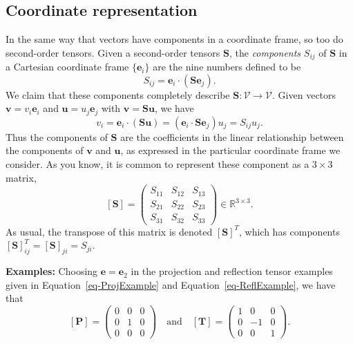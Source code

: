 \documentclass[
  letterpaper,
  DIV=11,
  numbers=noendperiod]{scrreprt}
\theoremstyle{plain}
\theoremstyle{remark}
\begin{document}
\subsection{Coordinate representation}\label{coordinate-representation}

In the same way that vectors have components in a coordinate frame, so
too do second-order tensors. Given a second-order tensors
\({\boldsymbol{S}}\), the \emph{components} \(S_{ij}\) of
\({\boldsymbol{S}}\) in a Cartesian coordinate frame
\(\{{\boldsymbol{e}}_i\}\) are the nine numbers defined to be
\[S_{ij} = {\boldsymbol{e}}_i\cdot ({\boldsymbol{S}}{\boldsymbol{e}}_j).\]
We claim that these components completely describe
\({\boldsymbol{S}}:{\mathcal{V}}\to{\mathcal{V}}\). Given vectors
\({\boldsymbol{v}}= v_i{\boldsymbol{e}}_i\) and
\({\boldsymbol{u}}= u_j{\boldsymbol{e}}_j\) with
\({\boldsymbol{v}}= {\boldsymbol{S}}{\boldsymbol{u}}\), we have
\[v_i = {\boldsymbol{e}}_i\cdot ({\boldsymbol{S}}{\boldsymbol{u}}) = ({\boldsymbol{e}}_i\cdot{\boldsymbol{S}}{\boldsymbol{e}}_j)u_j = S_{ij}u_j.\]
Thus the components of \({\boldsymbol{S}}\) are the coefficients in the
linear relationship between the components of \({\boldsymbol{v}}\) and
\({\boldsymbol{u}}\), as expressed in the particular coordinate frame we
consider. As you know, it is common to represent these component as a
\(3\times 3\) matrix, \[[{\boldsymbol{S}}] = \left(
    \begin{array}{ccc}
      S_{11} & S_{12} & S_{13} \\
      S_{21} & S_{22} & S_{23} \\
      S_{31} & S_{32} & S_{33}
    \end{array}\right)\in{\mathbb{R}}^{3\times 3}.\] As usual, the
transpose of this matrix is denoted \([{\boldsymbol{S}}]^T\), which has
components
\([{\boldsymbol{S}}]^T_{ij} = [{\boldsymbol{S}}]_{ji} = S_{ji}\).

\textbf{Examples:} Choosing \({\boldsymbol{e}}= {\boldsymbol{e}}_2\) in
the projection and reflection tensor examples given in
Equation~\ref{eq-ProjExample} and Equation~\ref{eq-ReflExample}, we have
that \[[{\boldsymbol{P}}] = \left(
    \begin{array}{ccc}
      0 & 0 & 0 \\
      0 & 1 & 0 \\
      0 & 0 & 0
    \end{array}\right)
  \quad\text{and}\quad
  [{\boldsymbol{T}}] = \left(
    \begin{array}{ccc}
      1 & 0 & 0 \\
      0 & -1 & 0 \\
      0 & 0 & 1
    \end{array}\right).\]
\end{document}
